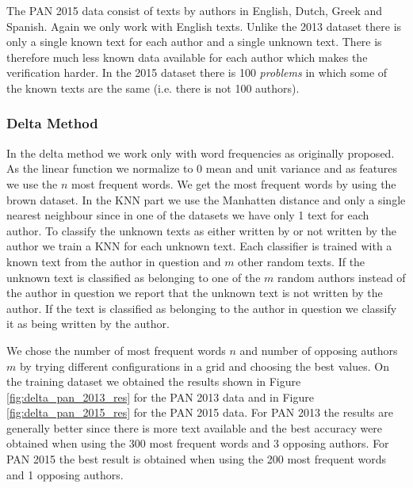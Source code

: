 The PAN 2015 data consist of texts by authors in English, Dutch, Greek and
Spanish. Again we only work with English texts. Unlike the 2013 dataset there is
only a single known text for each author and a single unknown text. There is
therefore much less known data available for each author which makes the
verification harder. In the 2015 dataset there is 100 \textit{problems} in which
some of the known texts are the same (i.e. there is not 100 authors).

\subsubsection{Delta Method}
In the delta method we work only with word frequencies as originally proposed.
As the linear function we normalize to 0 mean and unit variance and as features
we use the $n$ most frequent words. We get the most frequent words by using the
brown dataset. In the \gls{KNN} part we use the Manhatten distance and only a
single nearest neighbour since in one of the datasets we have only 1 text for
each author. To classify the unknown texts as either written by or not written
by the author we train a \gls{KNN} for each unknown text. Each classifier is
trained with a known text from the author in question and $m$ other random
texts. If the unknown text is classified as belonging to one of the $m$ random
authors instead of the author in question we report that the unknown text is not
written by the author. If the text is classified as belonging to the author in
question we classify it as being written by the author.

We chose the number of most frequent words $n$ and number of opposing
authors $m$ by trying different configurations in a grid and choosing the
best values. On the training dataset we obtained the results shown in
Figure \ref{fig:delta_pan_2013_res} for the PAN 2013 data and in Figure
\ref{fig:delta_pan_2015_res} for the PAN 2015 data. For PAN 2013 the results are
generally better since there is more text available and the best accuracy were
obtained when using the 300 most frequent words and 3 opposing authors. For PAN
2015 the best result is obtained when using the 200 most frequent words and 1
opposing authors.

